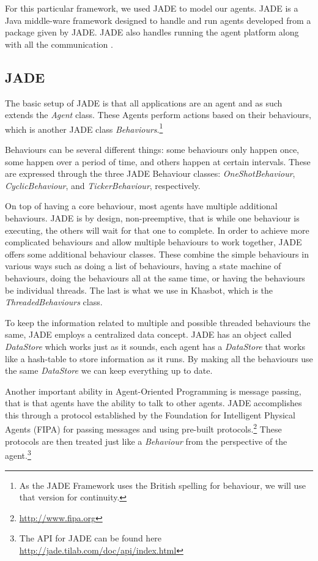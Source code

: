 \documentclass[letterpaper]{article}
\begin{document}
For this particular framework, we used JADE to model our agents.  JADE is a Java middle-ware framework designed to handle and run agents developed from a package given by JADE.  JADE also handles running the agent platform along with all the communication \cite{JADEbook}.

\subsection{JADE}
The basic setup of JADE is that all applications are an agent and as such extends the \emph{Agent} class.  These Agents perform actions based on their behaviours, which is another JADE class \emph{Behaviours}.\footnote{As the JADE Framework uses the British spelling for behaviour, we will use that version for continuity.}

Behaviours can be several different things: some behaviours only happen once, some happen over a period of time, and others happen at certain intervals.  These are expressed through the three JADE Behaviour classes: \emph{OneShotBehaviour}, \emph{CyclicBehaviour}, and \emph{TickerBehaviour}, respectively.

On top of having a core behaviour, most agents have multiple additional behaviours.  JADE is by design, non-preemptive, that is while one behaviour is executing, the others will wait for that one to complete.  In order to achieve more complicated behaviours and allow multiple behaviours to work together, JADE offers some additional behaviour classes.  These combine the simple behaviours in various ways such as doing a list of behaviours, having a state machine of behaviours, doing the behaviours all at the same time, or having the behaviours be individual threads.  The last is what we use in Khasbot, which is the \emph{ThreadedBehaviours} class.

To keep the information related to multiple and possible threaded behaviours the same, JADE employs a centralized data concept.  JADE has an object called \emph{DataStore} which works just as it sounds, each agent has a \emph{DataStore} that works like a hash-table to store information as it runs.  By making all the behaviours use the same \emph{DataStore} we can keep everything up to date.

Another important ability in Agent-Oriented Programming is message passing, that is that agents have the ability to talk to other agents.  JADE accomplishes this through a protocol established by the Foundation for Intelligent Physical Agents (FIPA) for passing messages and using pre-built protocols.\footnote{\url{http://www.fipa.org}}  These protocols are then treated just like a \emph{Behaviour} from the perspective of the agent.\footnote{The API for JADE can be found here \url{http://jade.tilab.com/doc/api/index.html}}
\end{document}

